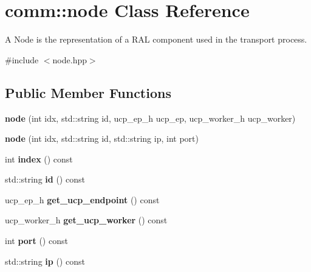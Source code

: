 \hypertarget{classcomm_1_1node}{}\section{comm\+:\+:node Class Reference}
\label{classcomm_1_1node}


A Node is the representation of a R\+AL component used in the transport process.  




{\ttfamily \#include $<$node.\+hpp$>$}

\subsection*{Public Member Functions}
\begin{DoxyCompactItemize}
\item 
\mbox{\label{classcomm_1_1node_a6d6755478f5717060afe973c51316895}} 
{\bfseries node} (int idx, std\+::string id, ucp\+\_\+ep\+\_\+h ucp\+\_\+ep, ucp\+\_\+worker\+\_\+h ucp\+\_\+worker)
\item 
\mbox{\label{classcomm_1_1node_ac7332802b078f244e450c1176473628a}} 
{\bfseries node} (int idx, std\+::string id, std\+::string ip, int port)
\item 
\mbox{\label{classcomm_1_1node_ac6cb39c359143a1d1ff98b2fd58574b2}} 
int {\bfseries index} () const
\item 
\mbox{\label{classcomm_1_1node_ad3d7f028b5365fd2ced908ea36bce12d}} 
std\+::string {\bfseries id} () const
\item 
\mbox{\label{classcomm_1_1node_ac3847e90c58b46e286aeb19ae9cde7d2}} 
ucp\+\_\+ep\+\_\+h {\bfseries get\+\_\+ucp\+\_\+endpoint} () const
\item 
\mbox{\label{classcomm_1_1node_ad0d268e67aada4d45befff1f74c4ee00}} 
ucp\+\_\+worker\+\_\+h {\bfseries get\+\_\+ucp\+\_\+worker} () const
\item 
\mbox{\label{classcomm_1_1node_a3df8fd0f7a8eb7ca0826bde57c343a03}} 
int {\bfseries port} () const
\item 
\mbox{\label{classcomm_1_1node_a6e008ccb0b828e33a61f831e85f153a7}} 
std\+::string {\bfseries ip} () const
\end{DoxyCompactItemize}
